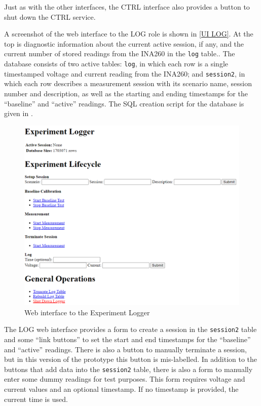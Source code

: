 Just as with the other interfaces, the CTRL interface also provides a button to shut down the CTRL service.

A screenshot of the web interface to the LOG role is shown in \autoref{UI LOG}. At the top is diagnostic information about the current active session, if any, and the current number of stored readings from the INA260 in the \verb!log! table.. The database consists of two active tables: \verb!log!, in which each row is a single timestamped voltage and current reading from the INA260; and \verb!session2!, in which each row describes a measurement session with its scenario name, session number and description, as well as the starting and ending timestamps for the \enquote{baseline} and \enquote{active} readings. The SQL creation script for the database is given in .

\begin{figure}[ht!]
\centering
\includegraphics[width=\columnwidth]{Figures/screenshots/Logger.png}
\caption{Web interface to the Experiment Logger}
\label{UI LOG}
\end{figure}

The LOG web interface provides a form to create a session in the \verb!session2! table and some \enquote{link buttons} to set the start and end timestamps for the \enquote{baseline} and \enquote{active} readings. There is also a button to manually terminate a session, but in this version of the prototype this button is mis-labelled. In addition to the buttons that add data into the \verb!session2! table, there is also a form to manually enter some dummy readings for test purposes. This form requires voltage and current values and an optional timestamp. If no timestamp is provided, the current time is used.

